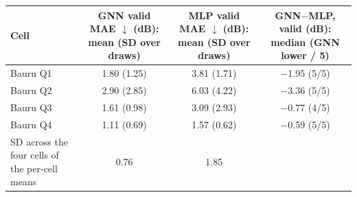 \begin{tabular}{lccc}
\toprule
Cell & \celula{GNN valid \\ \relax MAE $\downarrow$ (dB): \\ \relax mean (SD \\ \relax over draws)} & \celula{MLP valid \\ \relax MAE $\downarrow$ (dB): \\ \relax mean (SD \\ \relax over draws)} & \celula{GNN$-$MLP, \\ \relax valid (dB): \\ \relax median \\  \\ \relax (GNN lower \\ \relax / 5)} \\
\midrule
Bauru Q1 & 1.80 (1.25) & 3.81 (1.71) & \celula{$-$1.95 (5/5) \\ \relax [$-$2.70, $-$1.56]} \\
Bauru Q2 & 2.90 (2.85) & 6.03 (4.22) & \celula{$-$3.36 (5/5) \\ \relax [$-$5.06, $-$0.75]} \\
Bauru Q3 & 1.61 (0.98) & 3.09 (2.93) & \celula{$-$0.77 (4/5) \\ \relax [$-$4.78, +0.18]} \\
Bauru Q4 & 1.11 (0.69) & 1.57 (0.62) & \celula{$-$0.59 (5/5) \\ \relax [$-$0.76, $-$0.10]} \\
\midrule
SD across the four cells of the per-cell means & 0.76 & 1.85 &  \\
\bottomrule
\end{tabular}
